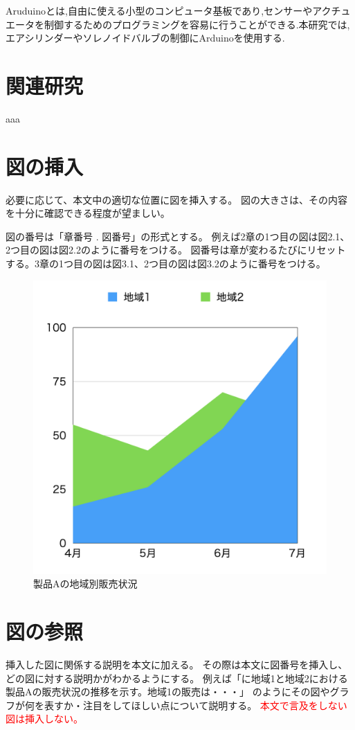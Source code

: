 Aruduinoとは,自由に使える小型のコンピュータ基板であり,センサーやアクチュエータを制御するためのプログラミングを容易に行うことができる.本研究では,エアシリンダーやソレノイドバルブの制御にArduinoを使用する.

\section{関連研究}
aaa
\subsection{}

\section{図の挿入}

必要に応じて、本文中の適切な位置に図を挿入する。
図の大きさは、その内容を十分に確認できる程度が望ましい。

図の番号は「章番号 . 図番号」の形式とする。
例えば2章の1つ目の図は図2.1、2つ目の図は図2.2のように番号をつける。
図番号は章が変わるたびにリセットする。3章の1つ目の図は図3.1、2つ目の図は図3.2のように番号をつける。

\begin{figure}[htbp]
  \centering
  \includegraphics[width=0.5\linewidth]{fig/chart1.png}
  \caption{製品Aの地域別販売状況}
  \label{fig:chart1}
\end{figure}

\section{図の参照}

挿入した図に関係する説明を本文に加える。
その際は本文に図番号を挿入し、どの図に対する説明かがわかるようにする。
例えば「に地域1と地域2における製品Aの販売状況の推移を示す。地域1の販売は・・・」
のようにその図やグラフが何を表すか・注目をしてほしい点について説明する。
\textcolor{red}{本文で言及をしない図は挿入しない。}

